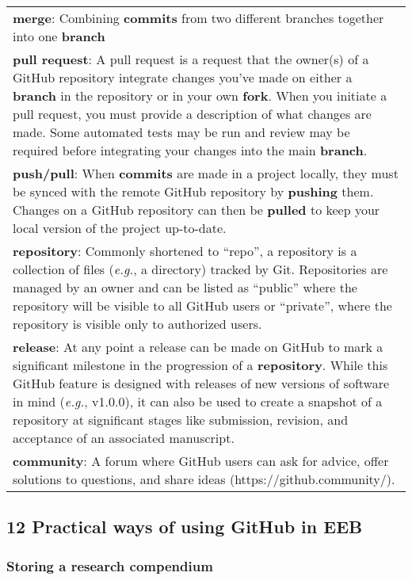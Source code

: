 \begin{tablenos:no-prefix-table-caption}
\begin{longtable}[]{@{}
  >{\raggedright\arraybackslash}p{}@{}}
\textbf{merge}: Combining \textbf{commits} from two different branches together into one \textbf{branch} \\
\textbf{pull request}: A pull request is a request that the owner(s) of a GitHub repository integrate changes you've made on either a \textbf{branch} in the repository or in your own \textbf{fork}. When you initiate a pull request, you must provide a description of what changes are made. Some automated tests may be run and review may be required before integrating your changes into the main \textbf{branch}. \\
\textbf{push/pull}: When \textbf{commits} are made in a project locally, they must be synced with the remote GitHub repository by \textbf{pushing} them. Changes on a GitHub repository can then be \textbf{pulled} to keep your local version of the project up-to-date. \\
\textbf{repository}: Commonly shortened to ``repo'', a repository is a collection of files (\emph{e.g.}, a directory) tracked by Git. Repositories are managed by an owner and can be listed as ``public'' where the repository will be visible to all GitHub users or ``private'', where the repository is visible only to authorized users. \\
\textbf{release}: At any point a release can be made on GitHub to mark a significant milestone in the progression of a \textbf{repository}. While this GitHub feature is designed with releases of new versions of software in mind (\emph{e.g.}, v1.0.0), it can also be used to create a snapshot of a repository at significant stages like submission, revision, and acceptance of an associated manuscript. \\
\textbf{community}: A forum where GitHub users can ask for advice, offer solutions to questions, and share ideas (https://github.community/). \\
\bottomrule
\end{longtable}

\end{tablenos:no-prefix-table-caption}

\hypertarget{practical-ways-of-using-github-in-eeb}{%
\subsection{12 Practical ways of using GitHub in EEB}\label{practical-ways-of-using-github-in-eeb}}

\hypertarget{storing-a-research-compendium}{%
\subsubsection{Storing a research compendium}\label{storing-a-research-compendium}}


